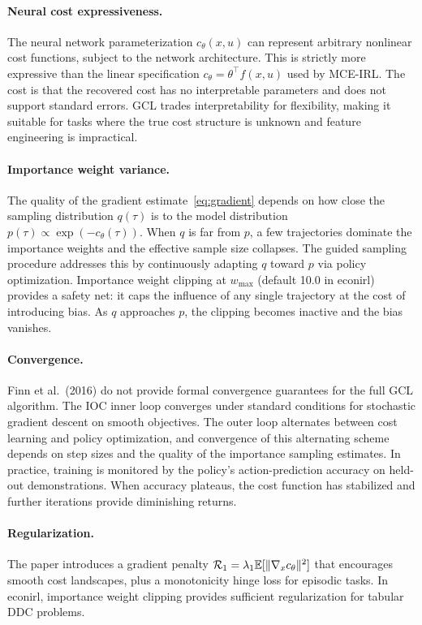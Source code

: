 \documentclass[11pt]{article}
\begin{document}
\paragraph{Neural cost expressiveness.}
The neural network parameterization $c_\theta(x,u)$ can represent arbitrary nonlinear cost functions, subject to the network architecture.
This is strictly more expressive than the linear specification $c_\theta = \theta^\top f(x,u)$ used by MCE-IRL.
The cost is that the recovered cost has no interpretable parameters and does not support standard errors.
GCL trades interpretability for flexibility, making it suitable for tasks where the true cost structure is unknown and feature engineering is impractical.

\paragraph{Importance weight variance.}
The quality of the gradient estimate~\eqref{eq:gradient} depends on how close the sampling distribution $q(\tau)$ is to the model distribution $p(\tau) \propto \exp(-c_\theta(\tau))$.
When $q$ is far from $p$, a few trajectories dominate the importance weights and the effective sample size collapses.
The guided sampling procedure addresses this by continuously adapting $q$ toward $p$ via policy optimization.
Importance weight clipping at $w_{\max}$ (default 10.0 in econirl) provides a safety net: it caps the influence of any single trajectory at the cost of introducing bias.
As $q$ approaches $p$, the clipping becomes inactive and the bias vanishes.

\paragraph{Convergence.}
Finn et al.\ (2016) do not provide formal convergence guarantees for the full GCL algorithm.
The IOC inner loop converges under standard conditions for stochastic gradient descent on smooth objectives.
The outer loop alternates between cost learning and policy optimization, and convergence of this alternating scheme depends on step sizes and the quality of the importance sampling estimates.
In practice, training is monitored by the policy's action-prediction accuracy on held-out demonstrations.
When accuracy plateaus, the cost function has stabilized and further iterations provide diminishing returns.

\paragraph{Regularization.}
The paper introduces a gradient penalty $\mathcal{R}_1 = \lambda_1 \mathbb{E}[\|\nabla_x c_\theta\|^2]$ that encourages smooth cost landscapes, plus a monotonicity hinge loss for episodic tasks.
In econirl, importance weight clipping provides sufficient regularization for tabular DDC problems.
\end{document}
